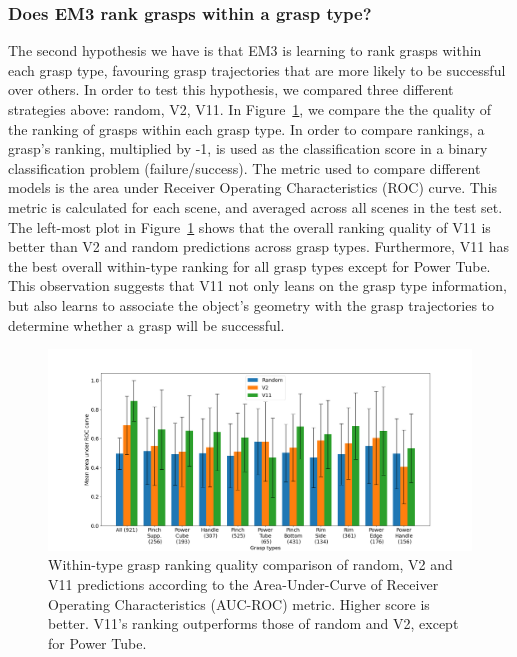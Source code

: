 
\subsubsection{Does EM3 rank grasps within a grasp type?}
\noindent

The second hypothesis we have is that EM3 is learning to rank grasps within each grasp type, favouring grasp trajectories that are more likely to be successful over others. In order to test this hypothesis, we compared three different strategies above: random, V2, V11. In Figure~\ref{fig:post5}, we compare the the quality of the ranking of grasps within each grasp type. In order to compare rankings, a grasp's ranking, multiplied by -1, is used as the classification score in a binary classification problem (failure/success). The metric used to compare different models is the area under Receiver Operating Characteristics (ROC) curve. This metric is calculated for each scene, and averaged across all scenes in the test set. The left-most plot in Figure~\ref{fig:post5} shows that the overall ranking quality of V11 is better than V2 and random predictions across grasp types. Furthermore, V11 has the best overall within-type ranking for all grasp types except for Power Tube. This observation suggests that V11 not only leans on the grasp type information, but also learns to associate the object's geometry with the grasp trajectories to determine whether a grasp will be successful.

\begin{figure}[h]
\centering
\includegraphics[width=0.999\columnwidth]{images/post-analysis/Ranking_quality_mean_AUC.png}
\caption{Within-type grasp ranking quality comparison of random, V2 and V11 predictions according to the Area-Under-Curve of Receiver Operating Characteristics (AUC-ROC) metric. Higher score is better. V11's ranking outperforms those of random and V2, except for Power Tube.}
\label{fig:post5}
\end{figure}

